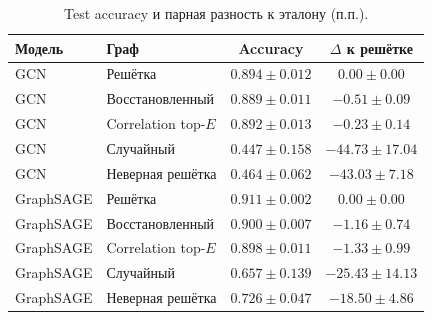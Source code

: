 \begin{table}[H]\centering
\small
\caption{Test accuracy и парная разность к эталону (п.п.).}
\begin{tabular}{@{}llcc@{}}\toprule
Модель & Граф & Accuracy & $\Delta$ к решётке \\
\midrule
GCN & Решётка & $0.894 \pm 0.012$ & $0.00 \pm 0.00$ \\
GCN & Восстановленный & $0.889 \pm 0.011$ & $-0.51 \pm 0.09$ \\
GCN & Correlation top-$E$ & $0.892 \pm 0.013$ & $-0.23 \pm 0.14$ \\
GCN & Случайный & $0.447 \pm 0.158$ & $-44.73 \pm 17.04$ \\
GCN & Неверная решётка & $0.464 \pm 0.062$ & $-43.03 \pm 7.18$ \\
GraphSAGE & Решётка & $0.911 \pm 0.002$ & $0.00 \pm 0.00$ \\
GraphSAGE & Восстановленный & $0.900 \pm 0.007$ & $-1.16 \pm 0.74$ \\
GraphSAGE & Correlation top-$E$ & $0.898 \pm 0.011$ & $-1.33 \pm 0.99$ \\
GraphSAGE & Случайный & $0.657 \pm 0.139$ & $-25.43 \pm 14.13$ \\
GraphSAGE & Неверная решётка & $0.726 \pm 0.047$ & $-18.50 \pm 4.86$ \\
\bottomrule
\end{tabular}
\end{table}
